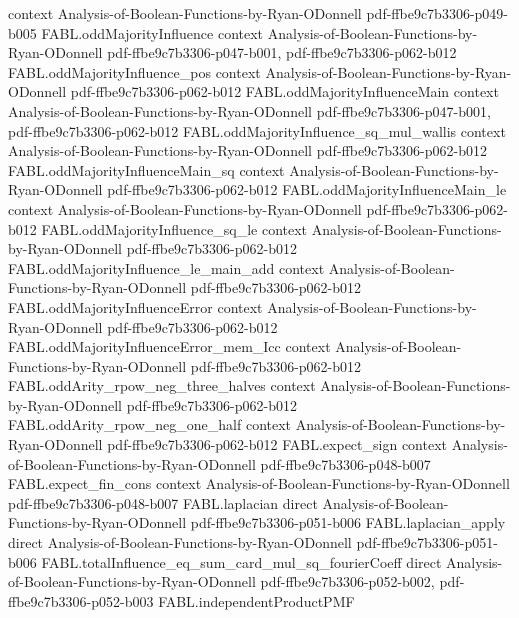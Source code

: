\begin{theorem}
  {context}
  {Analysis-of-Boolean-Functions-by-Ryan-ODonnell}
  {pdf-ffbe9c7b3306-p049-b005}
\proofstep
  {FABL.oddMajorityInfluence}
  {context}
  {Analysis-of-Boolean-Functions-by-Ryan-ODonnell}
  {pdf-ffbe9c7b3306-p047-b001,
    pdf-ffbe9c7b3306-p062-b012}
\proofstep
  {FABL.oddMajorityInfluence_pos}
  {context}
  {Analysis-of-Boolean-Functions-by-Ryan-ODonnell}
  {pdf-ffbe9c7b3306-p062-b012}
\proofstep
  {FABL.oddMajorityInfluenceMain}
  {context}
  {Analysis-of-Boolean-Functions-by-Ryan-ODonnell}
  {pdf-ffbe9c7b3306-p047-b001,
    pdf-ffbe9c7b3306-p062-b012}
\proofstep
  {FABL.oddMajorityInfluence_sq_mul_wallis}
  {context}
  {Analysis-of-Boolean-Functions-by-Ryan-ODonnell}
  {pdf-ffbe9c7b3306-p062-b012}
\proofstep
  {FABL.oddMajorityInfluenceMain_sq}
  {context}
  {Analysis-of-Boolean-Functions-by-Ryan-ODonnell}
  {pdf-ffbe9c7b3306-p062-b012}
\proofstep
  {FABL.oddMajorityInfluenceMain_le}
  {context}
  {Analysis-of-Boolean-Functions-by-Ryan-ODonnell}
  {pdf-ffbe9c7b3306-p062-b012}
\proofstep
  {FABL.oddMajorityInfluence_sq_le}
  {context}
  {Analysis-of-Boolean-Functions-by-Ryan-ODonnell}
  {pdf-ffbe9c7b3306-p062-b012}
\proofstep
  {FABL.oddMajorityInfluence_le_main_add}
  {context}
  {Analysis-of-Boolean-Functions-by-Ryan-ODonnell}
  {pdf-ffbe9c7b3306-p062-b012}
\proofstep
  {FABL.oddMajorityInfluenceError}
  {context}
  {Analysis-of-Boolean-Functions-by-Ryan-ODonnell}
  {pdf-ffbe9c7b3306-p062-b012}
\proofstep
  {FABL.oddMajorityInfluenceError_mem_Icc}
  {context}
  {Analysis-of-Boolean-Functions-by-Ryan-ODonnell}
  {pdf-ffbe9c7b3306-p062-b012}
\proofstep
  {FABL.oddArity_rpow_neg_three_halves}
  {context}
  {Analysis-of-Boolean-Functions-by-Ryan-ODonnell}
  {pdf-ffbe9c7b3306-p062-b012}
\proofstep
  {FABL.oddArity_rpow_neg_one_half}
  {context}
  {Analysis-of-Boolean-Functions-by-Ryan-ODonnell}
  {pdf-ffbe9c7b3306-p062-b012}
\proofstep
  {FABL.expect_sign}
  {context}
  {Analysis-of-Boolean-Functions-by-Ryan-ODonnell}
  {pdf-ffbe9c7b3306-p048-b007}
\proofstep
  {FABL.expect_fin_cons}
  {context}
  {Analysis-of-Boolean-Functions-by-Ryan-ODonnell}
  {pdf-ffbe9c7b3306-p048-b007}
\proofstep
  {FABL.laplacian}
  {direct}
  {Analysis-of-Boolean-Functions-by-Ryan-ODonnell}
  {pdf-ffbe9c7b3306-p051-b006}
\proofstep
  {FABL.laplacian_apply}
  {direct}
  {Analysis-of-Boolean-Functions-by-Ryan-ODonnell}
  {pdf-ffbe9c7b3306-p051-b006}
\proofstep
  {FABL.totalInfluence_eq_sum_card_mul_sq_fourierCoeff}
  {direct}
  {Analysis-of-Boolean-Functions-by-Ryan-ODonnell}
  {pdf-ffbe9c7b3306-p052-b002,
    pdf-ffbe9c7b3306-p052-b003}
\proofstep
  {FABL.independentProductPMF}

\end{theorem}

